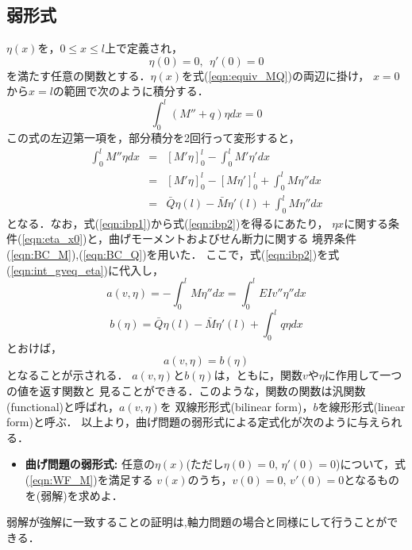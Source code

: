 \documentclass[10pt,a4j]{jarticle}
\begin{document}
\subsection{弱形式}
$\eta (x)$を，$0\leq x \leq l$上で定義され，
\begin{equation}
		\eta(0)=0, \ \  \eta'(0)=0
	\label{eqn:eta_x0}
\end{equation}
を満たす任意の関数とする．$\eta (x)$を式(\ref{eqn:equiv_MQ})の両辺に掛け，
$x=0$から$x=l$の範囲で次のように積分する．
\begin{equation}
	\int _0^l 
	\left(M''+q \right) \eta dx =0
	\label{eqn:int_gveq_eta}
\end{equation}
この式の左辺第一項を，部分積分を2回行って変形すると，
\begin{eqnarray}
	\int _0^l M''\eta dx &= & \left[ M'\eta \right]_0^l -\int_0^l M' \eta'dx  
	\label{eqn:ibp0}
	\\
	&= & \left[ M'\eta \right]_0^l -\left[M\eta'\right]_0^l+\int_0^l M \eta''dx  
	\label{eqn:ibp1}
	\\
	&= & \bar Q \eta(l) - \bar M \eta'(l)+\int_0^l M \eta''dx  
	\label{eqn:ibp2}
\end{eqnarray}
となる．なお，式(\ref{eqn:ibp1})から式(\ref{eqn:ibp2})を得るにあたり，
$\eta{x}$に関する条件(\ref{eqn:eta_x0})と，曲げモーメントおよびせん断力に関する
境界条件(\ref{eqn:BC_M}),(\ref{eqn:BC_Q})を用いた．
ここで，式(\ref{eqn:ibp2})を式(\ref{eqn:int_gveq_eta})に代入し，
\begin{equation}
	a(v,\eta) = -\int_0^l M \eta''dx  
	= \int_0^l EI v'' \eta''dx  
	\label{eqn:blinf_M}
\end{equation}
\begin{equation}
	b(\eta)= 
	\bar Q \eta (l) - 
	\bar M \eta' (l) + 
	\int_0^l q\eta dx 
	\label{eqn:linf_M}
\end{equation}
とおけば，
\begin{equation}
	a(v,\eta)=b(\eta)
	\label{eqn:WF_M}
\end{equation}
となることが示される．
$a(v,\eta)$と$b(\eta)$は，ともに，関数$v$や$\eta$に作用して一つの値を返す関数と
見ることができる．このような，関数の関数は汎関数(functional)と呼ばれ，$a(v,\eta)$を
双線形形式(bilinear form)，$b$を線形形式(linear form)と呼ぶ．
以上より，曲げ問題の弱形式による定式化が次のように与えられる．\\
\begin{itemize}
	\item
	{\bf 曲げ問題の弱形式:}
	任意の$\eta(x)$(ただし$\eta(0)=0,\, \eta'(0)=0$)について，式(\ref{eqn:WF_M})を満足する
	$v(x)$のうち，$v(0)=0,\, v'(0)=0$となるものを(弱解)を求めよ．
\end{itemize}
弱解が強解に一致することの証明は,軸力問題の場合と同様にして行うことができる．
\end{document}
